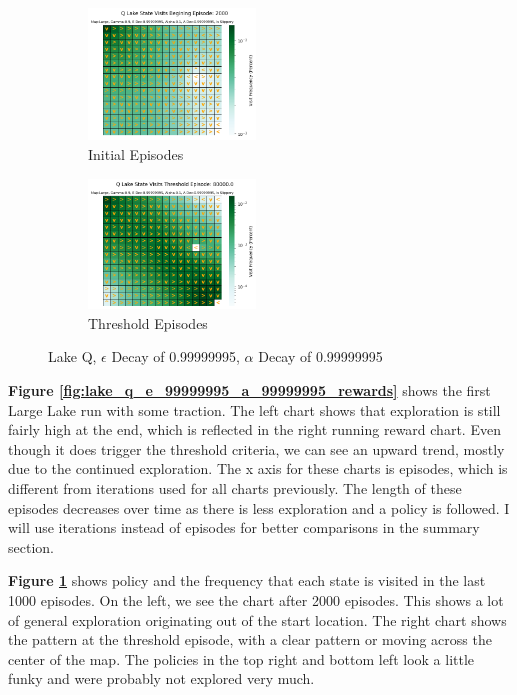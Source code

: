 \documentclass[letterpaper]{article} %
\begin{document}
\begin{figure}[!htb]
	\begin{subfigure}[b]{0.25\textwidth}
		\centering
		\includegraphics[width=1.75in]{Figures/Q_Lake_State_Visits_Begining_Episode__2000_Map_Large__Gamma_0_9__E_Dec_0_99999995__Alpha_0_1__A_Dec_0_99999995__Is_Slippery.png}
		\caption{Initial Episodes}
  	\end{subfigure}%
	\begin{subfigure}[b]{0.25\textwidth}
		\centering
		\includegraphics[width=1.75in]{Figures/Q_Lake_State_Visits_Threshold_Episode__80000_0_Map_Large__Gamma_0_9__E_Dec_0_99999995__Alpha_0_1__A_Dec_0_99999995__Is_Slippery.png}
		\caption{Threshold Episodes}
  	\end{subfigure}%
\caption{Lake Q,  $\epsilon$ Decay of 0.99999995, $\alpha$ Decay of 0.99999995}
\label{fig:lake_q_e_99999995_a_99999995_maps}
\end{figure}

\textbf{Figure \ref{fig:lake_q_e_99999995_a_99999995_rewards}} shows the first Large Lake run with some traction.  The left chart shows that exploration is still fairly high at the end, which is reflected in the right running reward chart.  Even though it does trigger the threshold criteria, we can see an upward trend, mostly due to the continued exploration.  The x axis for these charts is episodes, which is different from iterations used for all charts previously.   The length of these episodes decreases over time as there is less exploration and a policy is followed.   I will use iterations instead of episodes for better comparisons in the summary section.

\textbf{Figure \ref{fig:lake_q_e_99999995_a_99999995_maps}} shows policy and the frequency that each state is visited in the last 1000 episodes.  On the left, we see the chart after 2000 episodes.  This shows a lot of general exploration originating out of the start location.  The right chart shows the pattern at the threshold episode, with a clear pattern or moving across the center of the map.  The policies in the top right and bottom left look a little funky and were probably not explored very much.
\end{document}
